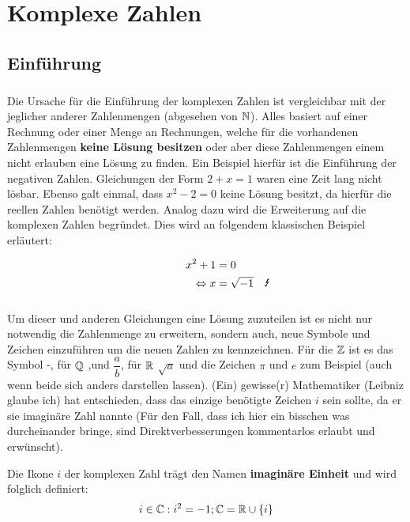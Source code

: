 \documentclass[../MAIN/main.tex]{subfiles}
\begin{document}
\chapter{Komplexe Zahlen}


\section{Einführung}

	\paragraph{} Die Ursache für die Einführung der komplexen Zahlen ist vergleichbar mit der jeglicher anderer Zahlenmengen (abgesehen
	von $\mathbb{N}$). Alles basiert auf einer Rechnung oder einer Menge an Rechnungen, welche für die vorhandenen Zahlenmengen \textbf{keine Lösung besitzen} oder aber diese Zahlenmengen einem nicht erlauben eine Lösung zu finden. Ein Beispiel hierfür ist die Einführung der
	negativen Zahlen. Gleichungen der Form $2 + x = 1$ waren eine Zeit lang nicht lösbar. Ebenso galt einmal, dass $x^2 - 2 = 0$ keine
	Lösung besitzt, da hierfür die reellen Zahlen benötigt werden. Analog dazu wird die Erweiterung auf die komplexen Zahlen begründet.
	Dies wird an folgendem klassischen Beispiel erläutert:

	\begin{align*}
		\qquad \qquad x^2 + 1 &= 0 \\
			\Leftrightarrow x &= \sqrt{-1} \quad \text{\Lightning}
	\end{align*}

	\paragraph{} Um dieser und anderen Gleichungen eine Lösung zuzuteilen ist es nicht nur notwendig die Zahlenmenge zu erweitern, sondern
	auch, neue Symbole und Zeichen einzuführen um die neuen Zahlen zu kennzeichnen. Für die $\mathbb{Z}$ ist es das Symbol \dq-\dq, für $\mathbb{Q}$
	\dq,\dq und $\dfrac{a}{b}$, für $\mathbb{R}$ $\sqrt{a}$ und die Zeichen $\pi$ und $e$ zum Beispiel (auch wenn beide sich anders darstellen lassen). (Ein) gewisse(r) Mathematiker (Leibniz glaube ich) hat entschieden, dass das einzige benötigte Zeichen $i$ sein sollte, da er sie imaginäre Zahl nannte (Für den Fall, dass ich hier ein bisschen was durcheinander bringe, sind Direktverbesserungen kommentarlos erlaubt und erwünscht).

	\begin{Definition}
		Die Ikone $i$ der komplexen Zahl trägt den Namen \textbf{imaginäre Einheit} und wird folglich definiert:
						$$i \in \C : i^2 = -1; \C \definedBy \R \cup \left\{i\right\}$$

	\end{Definition}
\end{document}
